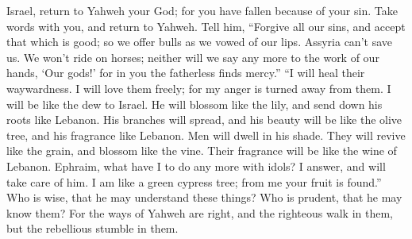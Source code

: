  Israel, return to Yahweh your God; for you have fallen
because of your sin.  Take words with you, and return to
Yahweh. Tell him, ``Forgive all our sins, and accept that which is good;
so we offer bulls as we vowed of our lips.  Assyria can't
save us. We won't ride on horses; neither will we say any more to the
work of our hands, `Our gods!' for in you the fatherless finds mercy.''
 ``I will heal their waywardness. I will love them freely;
for my anger is turned away from them.  I will be like the
dew to Israel. He will blossom like the lily, and send down his roots
like Lebanon.  His branches will spread, and his beauty
will be like the olive tree, and his fragrance like Lebanon.
 Men will dwell in his shade. They will revive like the
grain, and blossom like the vine. Their fragrance will be like the wine
of Lebanon.  Ephraim, what have I to do any more with
idols? I answer, and will take care of him. I am like a green cypress
tree; from me your fruit is found.''  Who is wise, that he
may understand these things? Who is prudent, that he may know them? For
the ways of Yahweh are right, and the righteous walk in them, but the
rebellious stumble in them.
